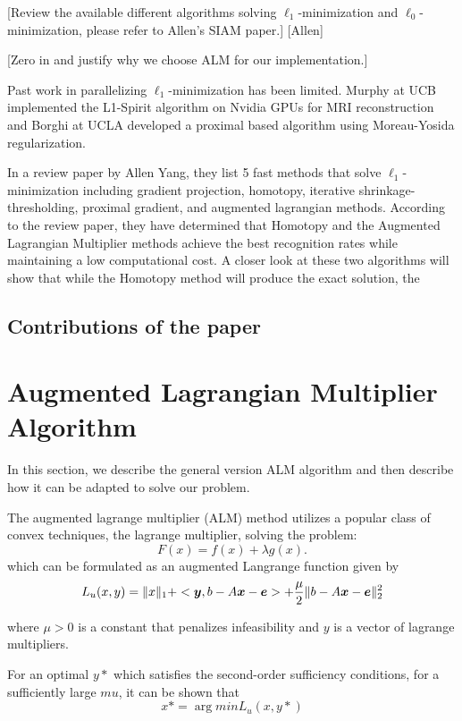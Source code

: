 \documentclass[10pt,twocolumn,letterpaper]{article}
\begin{document}
[Review the available different algorithms solving $\ell_1$-minimization and $\ell_0$-minimization, please refer to Allen's SIAM paper.]
[Allen]

[Zero in and justify why we choose ALM for our implementation.]

Past work in parallelizing $\ell_1$-minimization has been limited.  Murphy at UCB implemented the L1-Spirit algorithm on Nvidia GPUs for MRI reconstruction and Borghi at UCLA developed a proximal based algorithm using Moreau-Yosida regularization.  

In a review paper by Allen Yang, they list 5 fast methods that solve $\ell_1$-minimization including gradient projection, homotopy, iterative shrinkage-thresholding, proximal gradient, and augmented lagrangian methods.  According to the review paper, they have determined that Homotopy and the Augmented Lagrangian Multiplier methods achieve the best recognition rates while maintaining a low computational cost.  A closer look at these two algorithms will show that while the Homotopy method will produce the exact solution, the 

\subsection{Contributions of the paper}

\section{Augmented Lagrangian Multiplier Algorithm}

In this section, we describe the general version ALM algorithm and then describe how it can be adapted to solve our problem.

The augmented lagrange multiplier (ALM) method utilizes a popular class of convex techniques, the lagrange multiplier, solving the problem:
\begin{equation}
F(x) = f(x) + \lambda g(x).
\end{equation}
which can be formulated as an augmented Langrange function given by
\begin{equation}
L_u(x,y) = \|x\|_1 + <\boldsymbol{y}, b - A{\boldsymbol{x}} - \boldsymbol{e}> + \frac{\mu}2 \| b-A{\boldsymbol{x}}-\boldsymbol{e} \|_2^2
\end{equation}

where $\mu > 0$ is a constant that penalizes infeasibility and $y$ is a vector of lagrange multipliers.

For an optimal $y*$ which satisfies the second-order sufficiency conditions, for a sufficiently large $mu$, it can be shown that
\begin{equation}
x* = \arg min L_u(x,y*)
\end{equation}
\end{document}
